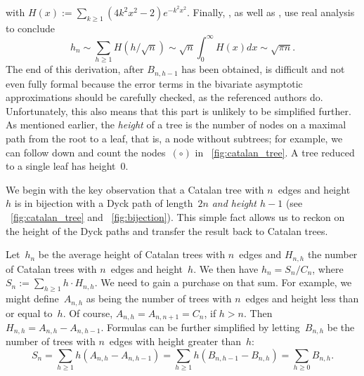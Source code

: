 with \(H(x) := \sum_{k \geqslant 1}(4k^2x^2-2)e^{-k^2x^2}\). Finally,
\citet*[5.9]{SedgewickFlajolet_1996}, as well as
\citet*[9.6]{GrahamKnuthPatashnik_1994}, use real analysis to conclude
\begin{equation*}
h_{n} \sim \sum_{h \geqslant 1}H(h/\!\sqrt{n})
\sim \sqrt{n} \int_0^{\infty}\!\!H(x) dx \sim \sqrt{\pi n}.
\end{equation*}
The end of this derivation, after \(B_{n,h-1}\) has been obtained, is
difficult and not even fully formal because the error terms in the
bivariate asymptotic approximations should be carefully checked, as
the referenced authors do. Unfortunately, this also means that this
part is unlikely to be simplified further.
As mentioned earlier, the \emph{height} of a tree is the number of
nodes on a maximal path from the root to a leaf, that is, a node
without subtrees; for example, we can follow down and count the
nodes~\((\circ)\) in \fig~\ref{fig:catalan_tree}. A tree reduced to a
single leaf has height~\(0\).

We begin with the key observation that a Catalan tree with \(n\)~edges
and height~\(h\) is in bijection with a Dyck path of length~\(2n\)
\emph{and height \(h-1\)} (see \fig~\vref{fig:catalan_tree} and
\fig~\ref{fig:bijection}). This simple fact allows us to reckon on the
height of the Dyck paths and transfer the result back to Catalan
trees.

Let~\(h_n\) be the average height of Catalan trees with \(n\)~edges
and \(H_{n,h}\) the number of Catalan trees with \(n\)~edges and
height~\(h\). We then have \(h_n = S_n/C_{n}\), where \(S_n := \sum_{h
  \geqslant 1} h \cdot H_{n,h}\). We need to gain a purchase on that
sum. For example, we might define~\(A_{n,h}\) as being the number of
trees with \(n\)~edges and height less than or equal to~\(h\). Of
course, \(A_{n,h} = A_{n,n+1} = C_{n}\), if \(h > n\). Then \(H_{n,h}
= A_{n,h}-A_{n,h-1}\). Formulas can be further simplified by
letting~\(B_{n,h}\) be the number of trees with \(n\)~edges with
height greater than~\(h\):
\begin{equation}
S_n = \sum_{h \geqslant 1}h(A_{n,h}-A_{n,h-1})
    = \sum_{h \geqslant 1}h(B_{n,h-1}-B_{n,h}) = \sum_{h\geqslant 0} B_{n,h}.
\label{eq:Sn}
\end{equation} 

